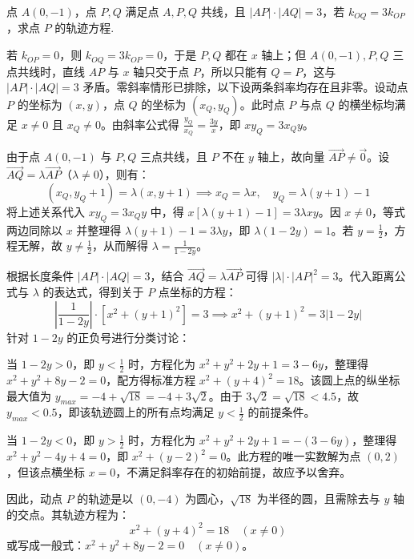 \begin{example}[抹茶T4]
    点 $A(0,-1)$，点 $P,Q$ 满足点 $A,P,Q$ 共线，且 $|AP|\cdot |AQ|=3$，若 $k_{OQ}=3k_{OP}$，求点 $P$ 的轨迹方程.
\end{example}
\begin{solution}
若 $k_{OP}=0$，则 $k_{OQ}=3k_{OP}=0$，于是 $P,Q$ 都在 $x$ 轴上；但 $A(0,-1),P,Q$ 三点共线时，直线 $AP$ 与 $x$ 轴只交于点 $P$，所以只能有 $Q=P$，这与 $|AP|\cdot |AQ|=3$ 矛盾。零斜率情形已排除，以下设两条斜率均存在且非零。设动点 $P$ 的坐标为 $(x, y)$，点 $Q$ 的坐标为 $(x_Q, y_Q)$。此时点 $P$ 与点 $Q$ 的横坐标均满足 $x \neq 0$ 且 $x_Q \neq 0$。由斜率公式得 $\frac{y_Q}{x_Q} = \frac{3y}{x}$，即 $x y_Q = 3x_Q y$。

由于点 $A(0, -1)$ 与 $P, Q$ 三点共线，且 $P$ 不在 $y$ 轴上，故向量 $\overrightarrow{AP} \neq \vec{0}$。设 $\overrightarrow{AQ} = \lambda \overrightarrow{AP}$（$\lambda \neq 0$），则有：
$$ (x_Q, y_Q + 1) = \lambda (x, y + 1) \implies x_Q = \lambda x, \quad y_Q = \lambda(y + 1) - 1 $$
将上述关系代入 $x y_Q = 3x_Q y$ 中，得 $x[\lambda(y + 1) - 1] = 3\lambda x y$。因 $x \neq 0$，等式两边同除以 $x$ 并整理得 $\lambda(y + 1) - 1 = 3\lambda y$，即 $\lambda(1 - 2y) = 1$。若 $y = \frac{1}{2}$，方程无解，故 $y \neq \frac{1}{2}$，从而解得 $\lambda = \frac{1}{1 - 2y}$。

根据长度条件 $|AP| \cdot |AQ| = 3$，结合 $\overrightarrow{AQ} = \lambda \overrightarrow{AP}$ 可得 $|\lambda| \cdot |AP|^2 = 3$。代入距离公式与 $\lambda$ 的表达式，得到关于 $P$ 点坐标的方程：
$$ \left| \frac{1}{1 - 2y} \right| \cdot [x^2 + (y + 1)^2] = 3 \implies x^2 + (y + 1)^2 = 3|1 - 2y| $$
针对 $1 - 2y$ 的正负号进行分类讨论：

当 $1 - 2y > 0$，即 $y < \frac{1}{2}$ 时，方程化为 $x^2 + y^2 + 2y + 1 = 3 - 6y$，整理得 $x^2 + y^2 + 8y - 2 = 0$，配方得标准方程 $x^2 + (y + 4)^2 = 18$。该圆上点的纵坐标最大值为 $y_{max} = -4 + \sqrt{18} = -4 + 3\sqrt{2}$。由于 $3\sqrt{2} = \sqrt{18} < 4.5$，故 $y_{max} < 0.5$，即该轨迹圆上的所有点均满足 $y < \frac{1}{2}$ 的前提条件。

当 $1 - 2y < 0$，即 $y > \frac{1}{2}$ 时，方程化为 $x^2 + y^2 + 2y + 1 = -(3 - 6y)$，整理得 $x^2 + y^2 - 4y + 4 = 0$，即 $x^2 + (y - 2)^2 = 0$。此方程的唯一实数解为点 $(0, 2)$，但该点横坐标 $x = 0$，不满足斜率存在的初始前提，故应予以舍弃。

因此，动点 $P$ 的轨迹是以 $(0, -4)$ 为圆心，$\sqrt{18}$ 为半径的圆，且需除去与 $y$ 轴的交点。其轨迹方程为：
$$ x^2 + (y + 4)^2 = 18 \quad (x \neq 0) $$
或写成一般式：$x^2 + y^2 + 8y - 2 = 0 \quad (x \neq 0)$。
\end{solution}
